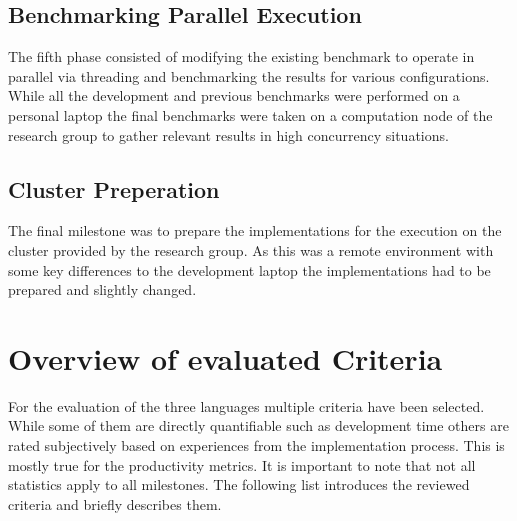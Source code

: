 \subsection*{Benchmarking Parallel Execution}
\label{subsec:Concept::Implementation::ParallelBenchmark}

The fifth phase consisted of modifying the existing benchmark to operate in parallel via threading and benchmarking the results for various configurations. While all the development and previous benchmarks were performed on a personal laptop the final benchmarks were taken on a computation node of the research group to gather relevant results in high concurrency situations.

\subsection*{Cluster Preperation}
\label{subsec:Concept::Implementation::ClusterPreparation}

The final milestone was to prepare the implementations for the execution on the cluster provided by the research group. As this was a remote environment with some key differences to the development laptop the implementations had to be prepared and slightly changed.

\section{Overview of evaluated Criteria}
\label{sec:Concept::Criteria}

For the evaluation of the three languages multiple criteria have been selected. While some of them are directly quantifiable such as development time others are rated subjectively based on experiences from the implementation process. This is mostly true for the productivity metrics. It is important to note that not all statistics apply to all milestones. The following list introduces the reviewed criteria and briefly describes them.
\\

